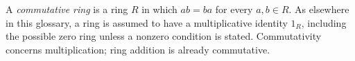 
A \emph{commutative ring} is a ring $R$ in which $ab=ba$ for every $a,b\in R$. As elsewhere in this glossary, a ring is assumed to have a multiplicative identity $1_R$, including the possible zero ring unless a nonzero condition is stated. Commutativity concerns multiplication; ring addition is already commutative.

